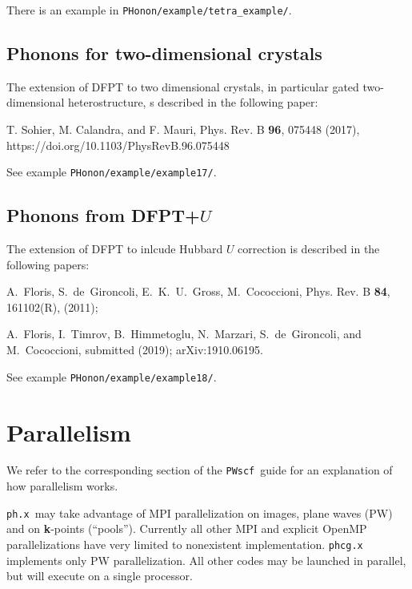 \documentclass[12pt,a4paper]{article}
\def\phx{\texttt{ph.x}}
\def\PWscf{\texttt{PWscf}}
\begin{document}
There is an example in \verb|PHonon/example/tetra_example/|.

\subsection{Phonons for two-dimensional crystals}

The extension of DFPT to two dimensional crystals,
in particular gated two-dimensional heterostructure,
s described in the following paper:

T. Sohier, M. Calandra, and F. Mauri, Phys. Rev. B {\bf 96}, 075448 (2017),
https://doi.org/10.1103/PhysRevB.96.075448

See example  \verb|PHonon/example/example17/|.

\subsection{Phonons from DFPT+$U$}

The extension of DFPT to inlcude Hubbard $U$ correction is described
in the following papers:

A.~Floris, S.~de~Gironcoli, E.~K.~U.~Gross, M.~Cococcioni, Phys. Rev. B {\bf 84}, 
161102(R), (2011);

A.~Floris, I.~Timrov, B.~Himmetoglu, N.~Marzari, S.~de~Gironcoli, and M.~Cococcioni, 
submitted (2019); arXiv:1910.06195.

See example  \verb|PHonon/example/example18/|.

\section{Parallelism}
\label{Sec:para}

We refer to the corresponding section of the \PWscf\ guide for
an explanation of how parallelism works. 

\phx\ may take advantage of MPI parallelization on images, plane waves (PW) 
and on {\bf k}-points (``pools''). Currently all other MPI and explicit 
OpenMP parallelizations have very limited to nonexistent implementation.
\texttt{phcg.x} implements only PW parallelization.
All other codes may be launched in parallel, but will execute 
on a single processor.
\end{document}

